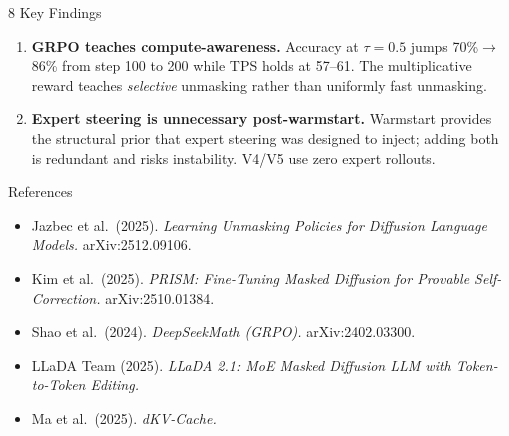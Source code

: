 \documentclass[final]{beamer}
\newlength{\colwidth} \setlength{\colwidth}{0.306\paperwidth}
\begin{document}
\begin{frame}[t]
\begin{columns}[t]
\begin{column}{\colwidth}
\begin{block}{8 \quad Key Findings}
\begin{enumerate}
  \item \textbf{GRPO teaches compute-awareness.}
        Accuracy at $\tau{=}0.5$ jumps 70\%$\to$86\%
        from step 100 to 200 while TPS holds at 57--61.
        The multiplicative reward teaches \emph{selective}
        unmasking rather than uniformly fast unmasking.

  \item \textbf{Expert steering is unnecessary post-warmstart.}
        Warmstart provides the structural prior that expert steering
        was designed to inject; adding both is redundant and risks
        instability. V4/V5 use zero expert rollouts.
\end{enumerate}
\end{block}

\begin{block}{References}
{\small
\begin{itemize}\itemsep1pt
  \item Jazbec et al.\ (2025). \textit{Learning Unmasking Policies for
        Diffusion Language Models.} arXiv:2512.09106.
  \item Kim et al.\ (2025). \textit{PRISM: Fine-Tuning Masked Diffusion
        for Provable Self-Correction.} arXiv:2510.01384.
  \item Shao et al.\ (2024). \textit{DeepSeekMath (GRPO).}
        arXiv:2402.03300.
  \item LLaDA Team (2025). \textit{LLaDA 2.1: MoE Masked Diffusion LLM
        with Token-to-Token Editing.}
  \item Ma et al.\ (2025). \textit{dKV-Cache.}
\end{itemize}
}
\end{block}

\end{column}
\end{columns}
\end{frame}
\end{document}
